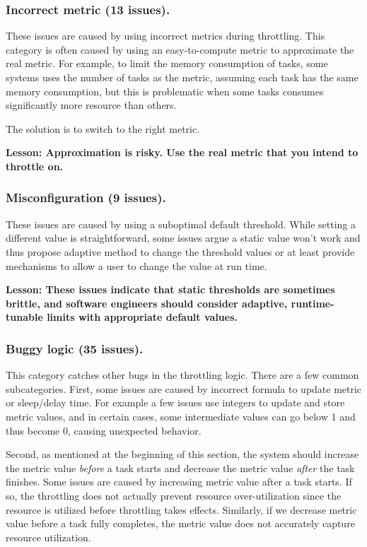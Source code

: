 \subsubsection{Incorrect metric (13 issues).} These issues are caused by using incorrect metrics during
throttling. This category is often caused by using an easy-to-compute metric to approximate
the real metric. For example, to limit the memory consumption of tasks, some systems
uses the number of tasks as the metric, assuming each task has the same memory
consumption, but this is problematic when some tasks consumes significantly more resource
than others.

The solution is to switch to the right metric.

\noindent
\textbf{Lesson: Approximation is risky. Use the real metric that you intend to throttle on.}

\subsubsection{Misconfiguration (9 issues).} These issues are caused by using a suboptimal default
threshold. While setting a different value is straightforward, some issues argue a static value
won't work and thus propose adaptive method to change the threshold values or at least
provide mechanisms to allow a user to change the value at run time.

\noindent
\textbf{Lesson: These issues indicate that static thresholds are sometimes brittle, and 
software engineers should consider adaptive, runtime-tunable limits with appropriate default values.}

\subsubsection{Buggy logic (35 issues).} This category catches other bugs in the throttling logic.
There are a few common subcategories. First, some issues are caused by incorrect formula
to update metric or sleep/delay time. For example a few issues use integers to update and
store metric values, and in certain cases, some intermediate values can go below 1 and thus
become 0, causing unexpected behavior. 

Second, as mentioned at the beginning of this section,
the system should increase the metric value \emph{before} a task starts and decrease the metric 
value \emph{after} the task finishes. Some issues are caused by increasing metric value after
a task starts. If so, the throttling does not actually prevent resource over-utilization since the
resource is utilized before throttling takes effects. Similarly, if we decrease metric value before
a task fully completes, the metric value does not accurately capture resource utilization.

